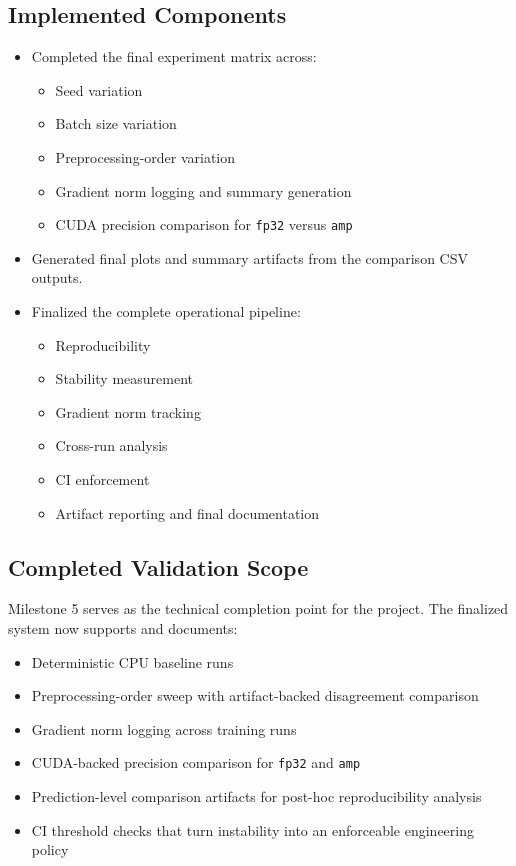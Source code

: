 \documentclass[11pt]{article}
\begin{document}
\subsection*{Implemented Components}
\begin{itemize}
  \item Completed the final experiment matrix across:
    \begin{itemize}
      \item Seed variation
      \item Batch size variation
      \item Preprocessing-order variation
      \item Gradient norm logging and summary generation
      \item CUDA precision comparison for \texttt{fp32} versus \texttt{amp}
    \end{itemize}
  \item Generated final plots and summary artifacts from the comparison CSV outputs.
  \item Finalized the complete operational pipeline:
    \begin{itemize}
      \item Reproducibility
      \item Stability measurement
      \item Gradient norm tracking
      \item Cross-run analysis
      \item CI enforcement
      \item Artifact reporting and final documentation
    \end{itemize}
\end{itemize}

\subsection*{Completed Validation Scope}
Milestone 5 serves as the technical completion point for the project. The finalized system now supports and documents:
\begin{itemize}
  \item Deterministic CPU baseline runs
  \item Preprocessing-order sweep with artifact-backed disagreement comparison
  \item Gradient norm logging across training runs
  \item CUDA-backed precision comparison for \texttt{fp32} and \texttt{amp}
  \item Prediction-level comparison artifacts for post-hoc reproducibility analysis
  \item CI threshold checks that turn instability into an enforceable engineering policy
\end{itemize}
\end{document}
